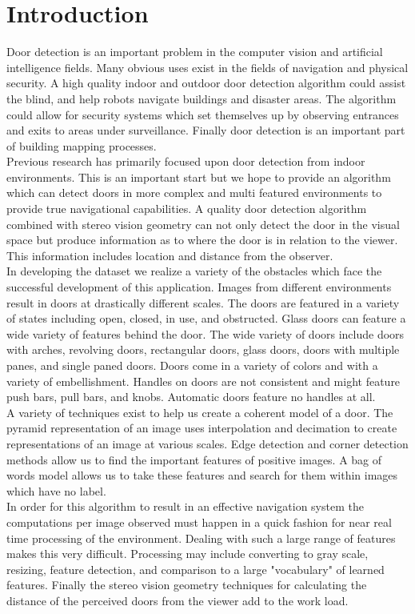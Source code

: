 \documentclass[twocolumn,nofootinbib,%
notitlepage,10pt]{report}
\begin{document}
\section{Introduction}
Door detection is an important problem in the computer vision and artificial intelligence fields. Many obvious uses exist in the fields of navigation and physical security. A high quality indoor and outdoor door detection algorithm could assist the blind, and help robots navigate buildings and disaster areas. The algorithm could allow for security systems which set themselves up by observing entrances and exits to areas under surveillance. Finally door detection is an important part of building mapping processes.\\
\indent Previous research has primarily focused upon door detection from indoor environments. This is an important start but we hope to provide an algorithm which can detect doors in more complex and multi featured environments to provide true navigational capabilities. A quality door detection algorithm combined with stereo vision geometry can not only detect the door in the visual space but produce information as to where the door is in relation to the viewer. This information includes location and distance from the observer.\\
\indent In developing the dataset we realize a variety of the obstacles which face the successful development of this application. Images from different  environments result in doors at drastically different scales. The doors are featured in a variety of states including open, closed, in use, and obstructed. Glass doors can feature a wide variety of features behind the door. The wide variety of doors include doors with arches, revolving doors, rectangular doors, glass doors, doors with multiple panes, and single paned doors. Doors come in a variety of colors and with a variety of embellishment. Handles on doors are not consistent and might feature push bars, pull bars, and knobs. Automatic doors feature no handles at all.\\
\indent A variety of techniques exist to help us create a coherent model of a door. The pyramid representation of an image uses interpolation and decimation to create representations of an image at various scales. Edge detection and corner detection methods allow us to find the important features of positive images. A bag of words model allows us to take these features and search for them within images which have no label.\\
\indent In order for this algorithm to result in an effective navigation system the computations per image observed must happen in a quick fashion for near real time processing of the environment. Dealing with such a large range of features makes this very difficult. Processing may include converting to gray scale, resizing, feature detection, and comparison to a large "vocabulary" of learned features. Finally the stereo vision geometry techniques for calculating the distance of the perceived doors from the viewer add to the work load.\\
\end{document}
